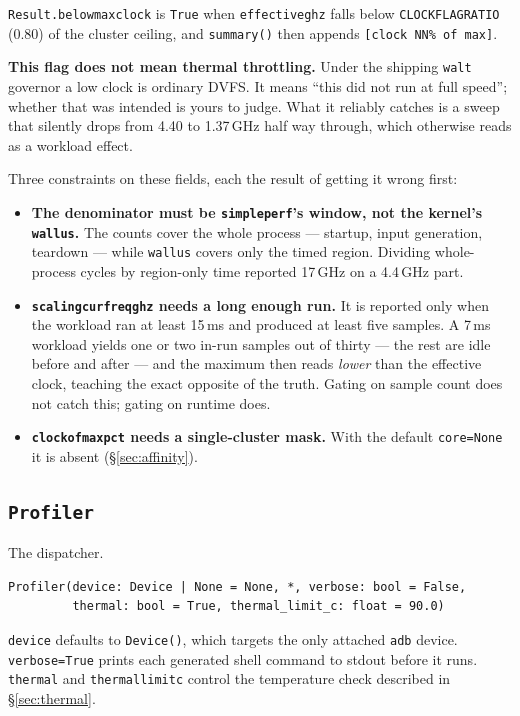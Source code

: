 \documentclass[11pt,a4paper]{article}
\newcommand{\code}[1]{\texttt{\let\_\breakableunderscore #1}}
\newcommand{\breakableunderscore}{\textunderscore\allowbreak}
\newcommand{\apient}[1]{\subsection{\texttt{#1}}}
\begin{document}
\noindent \code{Result.below\_max\_clock} is \code{True} when
\code{effective\_ghz} falls below \code{CLOCK\_FLAG\_RATIO} (0.80) of the
cluster ceiling, and \code{summary()} then appends
\code{[clock NN\% of max]}.

\textbf{This flag does not mean thermal throttling.} Under the shipping
\code{walt} governor a low clock is ordinary DVFS. It means ``this did not run
at full speed''; whether that was intended is yours to judge. What it reliably
catches is a sweep that silently drops from 4.40 to 1.37\,GHz half way through,
which otherwise reads as a workload effect.

Three constraints on these fields, each the result of getting it wrong first:

\begin{itemize}[leftmargin=0.6cm]
  \item \textbf{The denominator must be \code{simpleperf}'s window, not the
    kernel's \code{wall\_us}.} The counts cover the whole process --- startup,
    input generation, teardown --- while \code{wall\_us} covers only the timed
    region. Dividing whole-process cycles by region-only time reported
    17\,GHz on a 4.4\,GHz part.
  \item \textbf{\code{scaling\_cur\_freq\_ghz} needs a long enough run.} It is
    reported only when the workload ran at least 15\,ms and produced at least
    five samples. A 7\,ms workload yields one or two in-run samples out of
    thirty --- the rest are idle before and after --- and the maximum then reads
    \emph{lower} than the effective clock, teaching the exact opposite of the
    truth. Gating on sample count does not catch this; gating on runtime does.
  \item \textbf{\code{clock\_of\_max\_pct} needs a single-cluster mask.} With
    the default \code{core=None} it is absent (\S\ref{sec:affinity}).
\end{itemize}

\apient{Profiler}

The dispatcher.

\begin{lstlisting}
Profiler(device: Device | None = None, *, verbose: bool = False,
         thermal: bool = True, thermal_limit_c: float = 90.0)
\end{lstlisting}

\noindent \code{device} defaults to \code{Device()}, which targets the only
attached \code{adb} device. \code{verbose=True} prints each generated shell
command to stdout before it runs. \code{thermal} and \code{thermal\_limit\_c}
control the temperature check described in \S\ref{sec:thermal}.
\end{document}
